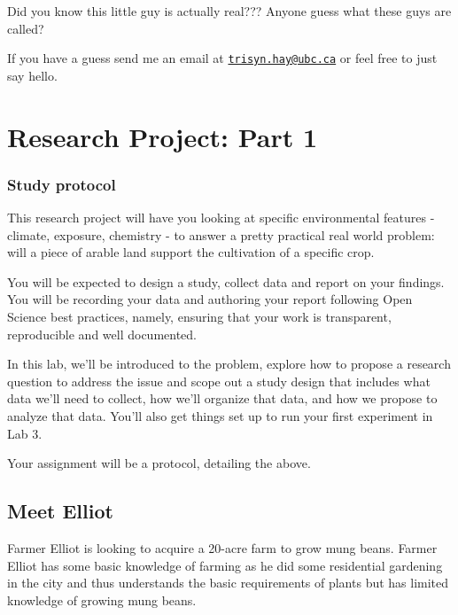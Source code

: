 \documentclass[
]{book}
\begin{document}
Did you know this little guy is actually real??? Anyone guess what these guys are called?

If you have a guess send me an email at \href{mailto:trisyn.hay@ubc.ca}{\nolinkurl{trisyn.hay@ubc.ca}} or feel free to just say hello.

\hypertarget{research-project-part-1}{%
\chapter*{Research Project: Part 1}\label{research-project-part-1}}

\hypertarget{study-protocol}{%
\subsection*{Study protocol}\label{study-protocol}}

This research project will have you looking at specific environmental features - climate, exposure, chemistry - to answer a pretty practical real world problem: will a piece of arable land support the cultivation of a specific crop.

You will be expected to design a study, collect data and report on your findings. You will be recording your data and authoring your report following Open Science best practices, namely, ensuring that your work is transparent, reproducible and well documented.

In this lab, we'll be introduced to the problem, explore how to propose a research question to address the issue and scope out a study design that includes what data we'll need to collect, how we'll organize that data, and how we propose to analyze that data. You'll also get things set up to run your first experiment in Lab 3.

Your assignment will be a protocol, detailing the above.

\hypertarget{meet-elliot}{%
\section*{Meet Elliot}\label{meet-elliot}}

Farmer Elliot is looking to acquire a 20-acre farm to grow mung beans. Farmer Elliot has some basic knowledge of farming as he did some residential gardening in the city and thus understands the basic requirements of plants but has limited knowledge of growing mung beans.
\end{document}
